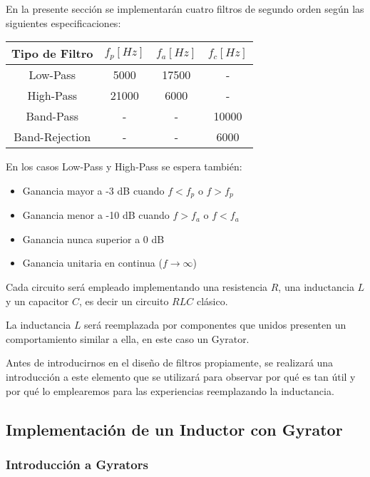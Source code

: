 En la presente sección se implementarán cuatro filtros de segundo orden según las siguientes especificaciones:

\begin{table}[H]
    \centering
    \begin{tabular}{|c|c|c|c|}
    \hline
    \rowcolor[HTML]{C0C0C0} 
    Tipo de Filtro & $f_p[Hz]$ & $f_a[Hz]$ & $f_c[Hz]$ \\ \hline
    Low-Pass       & 5000   & 17500  & -      \\ \hline
    High-Pass      & 21000   & 6000   & -      \\ \hline
    Band-Pass      & -      & -      & 10000  \\ \hline
    Band-Rejection & -      & -      & 6000   \\ \hline
    \end{tabular}
    \end{table}

En los casos Low-Pass y High-Pass se espera también:

\begin{itemize}
	\item Ganancia mayor a -3 dB cuando $f < f_p$ o $f > f_p$ 
	\item Ganancia menor a -10 dB cuando $f > f_a$ o $f < f_a$
	\item Ganancia nunca superior a 0 dB
	\item Ganancia unitaria en continua ($f \to \infty$)
\end{itemize}

Cada circuito será empleado implementando una resistencia $R$, una inductancia $L$ y un capacitor $C$, es decir un circuito $RLC$
clásico. 

La inductancia $L$ será reemplazada por componentes que unidos presenten un comportamiento similar a ella, en este caso
un Gyrator. 

Antes de introducirnos en el diseño de filtros propiamente, se realizará una introducción a este elemento que se utilizará para observar
por qué es tan útil y por qué lo emplearemos para las experiencias reemplazando la inductancia.

\subsection{Implementación de un Inductor con Gyrator}

\subsubsection{Introducción a Gyrators}


